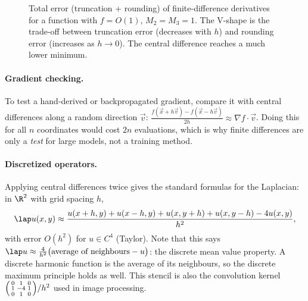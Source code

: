 \begin{figure}[ht]
\centering
{}
\caption{Total error (truncation + rounding) of finite-difference derivatives for a function with $f=O(1)$, $M_2=M_3=1$. The V-shape is the trade-off between truncation error (decreases with $h$) and rounding error (increases as $h\to0$). The central difference reaches a much lower minimum.}
\label{fig:fderror}
\end{figure}

\paragraph{Gradient checking.} To test a hand-derived or backpropagated gradient, compare it with central differences along a random direction $\vec v$: $\frac{f(\vec x+h\vec v)-f(\vec x-h\vec v)}{2h}\approx\nabla f\cdot\vec v$. Doing this for all $n$ coordinates would cost $2n$ evaluations, which is why finite differences are only a \emph{test} for large models, not a training method.

\paragraph{Discretized operators.} Applying central differences twice gives the standard formulas for the Laplacian: in $\R^2$ with grid spacing $h$,
\[
\lap u(x,y)\approx\frac{u(x+h,y)+u(x-h,y)+u(x,y+h)+u(x,y-h)-4u(x,y)}{h^2},
\]
with error $O(h^2)$ for $u\in C^4$ (Taylor). Note that this says $\lap u\approx\frac4{h^2}\bigl(\text{average of neighbours}-u\bigr)$: the discrete mean value property. A discrete harmonic function is the average of its neighbours, so the discrete maximum principle holds as well. This stencil is also the convolution kernel $\begin{psmallmatrix}0&1&0\\1&-4&1\\0&1&0\end{psmallmatrix}/h^2$ used in image processing.

